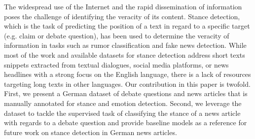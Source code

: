 The widespread use of the Internet and the rapid dissemination of information poses the challenge of identifying the veracity of its content. Stance detection, which is the task of predicting the position of a text in regard to a specific target (e.g. claim or debate question), has been used to determine the veracity of information in tasks such as rumor classification and fake news detection. While most of the work and available datasets for stance detection address short texts snippets extracted from textual dialogues, social media platforms, or news headlines with a strong focus on the English language, there is a lack of resources targeting long texts in other languages. Our contribution in this paper is twofold. First, we present a German dataset of debate questions and news articles  that is manually annotated for stance and emotion detection. Second, we leverage the dataset to tackle the supervised task of classifying the stance of a news article with regards to a debate question and provide baseline models as a reference for future work on stance detection in German news articles.
